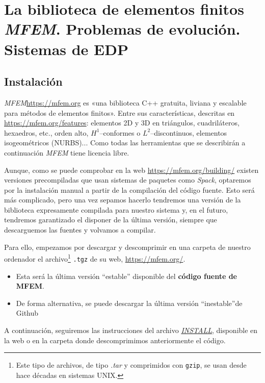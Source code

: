 \newcommand{\mfem}{\textit{MFEM}\xspace}
\newcommand{\glvis}{\textit{GLVis}\xspace}

\section{La biblioteca de elementos finitos \mfem. Problemas de evolución. Sistemas de EDP}
\subsection{Instalación}
\label{sec:03:instalacion}

\mfem \url{https://mfem.org} es «una biblioteca C++ gratuita, liviana
y escalable para métodos de elementos finitos».  Entre sus
características, descritas en \url{https://mfem.org/features}:
elementos 2D y 3D en triángulos, cuadriláteros, hexaedros, etc., orden
alto, $H^1$--conformes o $L^2$--discontinuos, elementos isogeométricos
(NURBS)...  Como todas las herramientas que se describirán a
continuación \mfem tiene licencia libre.

Aunque, como se puede comprobar en la web
\url{https://mfem.org/building/} existen versiones precompiladas que
usan sistemas de paquetes como \textit{Spack}, optaremos por la
instalación manual a partir de la compilación del código fuente.
Esto será más complicado, pero una vez sepamos hacerlo tendremos una
versión de la biblioteca expresamente compilada para nuestro sistema
y, en el futuro, tendremos garantizado el disponer de la última
versión, siempre que descarguemos las fuentes y volvamos a compilar.

Para ello, empezamos por descargar y descomprimir en una carpeta de
nuestro ordenador el archivo\footnote{Este tipo de archivos, de tipo
  \textit{.tar} y comprimidos con \texttt{gzip}, se usan desde hace
  décadas en sistemas UNIX.}  \texttt{.tgz} de su web,
\url{https://mfem.org/}.
\begin{itemize}
\item Esta será la última versión ``estable'' disponible del \textbf{código fuente de MFEM}.
\item De forma alternativa, se puede descargar la última versión ``inestable''de Github
\end{itemize}


A continuación, seguiremos las instrucciones del archivo
\href{https://raw.githubusercontent.com/mfem/mfem/master/INSTALL}{\textit{INSTALL}},
disponible en la web o en la carpeta donde descomprimimos anteriormente el código.

